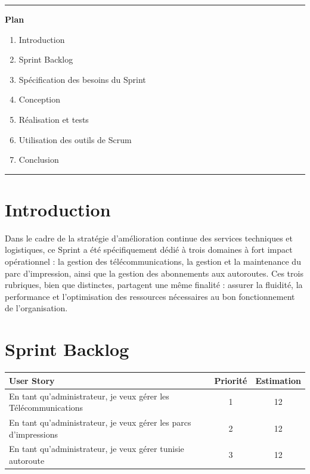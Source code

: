 \documentclass[a4paper,11pt]{report}
\begin{document}
\vspace{1.5cm}
\begin{center}
  \color{blue!60!black}\rule{0.6\textwidth}{1pt}
\end{center}
\vspace{1.5cm}

\begin{center}
  {\huge\bfseries Plan}\\[0.5em]
\end{center}
\vspace{1em}

\begin{enumerate}[%
  label=\bfseries\Large\arabic*., 
  leftmargin=2cm, 
  itemsep=1em
]
   \item Introduction
  \item Sprint Backlog
  \item Spécification des besoins du Sprint
  \item Conception
  \item Réalisation et tests
  \item Utilisation des outils de Scrum
  \item Conclusion
\end{enumerate}

\vfill
\begin{center}
  \color{blue!60!black}\rule{0.6\textwidth}{0.8pt}
\end{center}

\newpage
\setcounter{section}{0}

\section{Introduction}

Dans le cadre de la stratégie d’amélioration continue des services techniques et logistiques, ce Sprint a été spécifiquement dédié à trois domaines à fort impact opérationnel : la gestion des télécommunications, la gestion et la maintenance du parc d’impression, ainsi que la gestion des abonnements aux autoroutes. Ces trois rubriques, bien que distinctes, partagent une même finalité : assurer la fluidité, la performance et l’optimisation des ressources nécessaires au bon fonctionnement de l'organisation.

\section{Sprint Backlog}

\begin{table}[h]
\centering
\begin{tabular}{|>{\raggedright\arraybackslash}p{7cm}|c|c|}
\hline
\textbf{User Story} & \textbf{Priorité} & \textbf{Estimation} \\
\hline
En tant qu’administrateur, je veux gérer les Télécommunications 
& 1 & 12 \\
\hline
En tant qu’administrateur, je veux gérer les parcs d’impressions 
& 2 & 12 \\
\hline
En tant qu’administrateur, je veux gérer tunisie autoroute 
& 3 & 12 \\
\hline
\end{tabular}
\end{table}
\newpage
\end{document}
